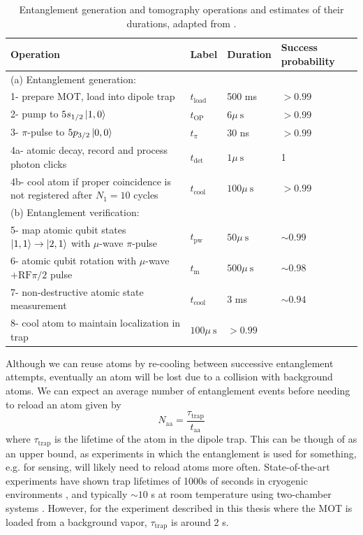 \newpage
\begin{table}
    \centering    
    \begin{tabular}{llll}
        \hline Operation & Label & Duration & Success probability \\
        \hline (a) Entanglement generation: & & & \\
        1- prepare MOT, load into dipole trap & $t_{\textrm{load}}$ & 500 ms & $>0.99$ \\
        2- pump to $5 s_{1 / 2}\ket{1,0}$ & $t_{\textrm{OP}}$ & $6 \mu \mathrm{~s}$ & $>0.99$ \\
        3- $\pi$-pulse to $5 p_{3 / 2}\ket{0,0}$ & $t_\pi$ & 30 ns & $>0.99$ \\
        4a- atomic decay, record and process photon clicks & $t_{\text {det }}$ & $1 \mu \mathrm{~s}$ & 1 \\
        4b- cool atom if proper coincidence is not registered after $N_1=10$ cycles & $t_{\textrm{cool}}$ & $100 \mu \mathrm{~s}$ & $>0.99$ \\
        (b) Entanglement verification: & & & \\
        5- map atomic qubit states $\ket{1,1} \rightarrow \ket{2,1}$ with $\mu$-wave $\pi$-pulse & $t_{\textrm{pw}}$ & $50 \mu \mathrm{~s}$ & $\sim 0.99$ \\
        6- atomic qubit rotation with $\mu$-wave $+\mathrm{RF} \pi / 2$ pulse & $t_{\mathrm{m}}$ & $500 \mu \mathrm{~s}$ & $\sim 0.98$ \\
        7- non-destructive atomic state measurement & $t_{\textrm{cool}}$ & 3 ms & $\sim 0.94$\cite{Kwon2017} \\
        8- cool atom to maintain localization in trap & $100 \mu \mathrm{~s}$ & $>0.99$ \\
        \hline
    \end{tabular}
    \caption{Entanglement generation and tomography operations and estimates of their durations, adapted from \cite{Young2022}.}
    \label{tab:entanglement_steps}
\end{table}
\newpage

Although we can reuse atoms by re-cooling between successive entanglement attempts, eventually an atom will be lost due to a collision with background atoms. We can expect an average number of entanglement events before needing to reload an atom given by 
\begin{equation}
    N_{\text{aa}} = \frac{\tau_{\text{trap}}}{t_{\text{aa}}}
\end{equation}
where $\tau_{\text{trap}}$ is the lifetime of the atom in the dipole trap. This can be though of as an upper bound, as experiments in which the entanglement is used for something, e.g. for sensing, will likely need to reload atoms more often. State-of-the-art experiments have shown trap lifetimes of 1000s of seconds in cryogenic environments \cite{Schymik2021}, and typically $\sim10$ s at room temperature using two-chamber systems \cite{Graham2022}. However, for the experiment described in this thesis where the MOT is loaded from a background vapor, $\tau_{\text{trap}}$ is around 2 s.

